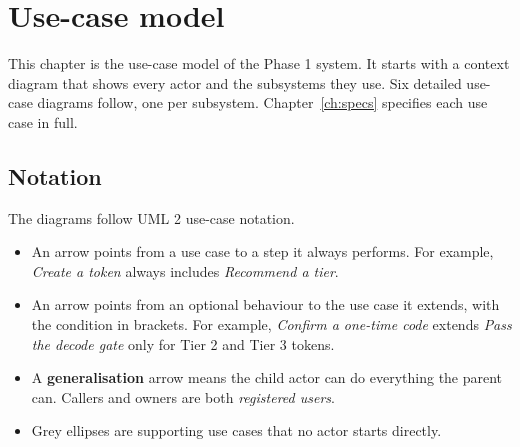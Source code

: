 \chapter{Use-case model}
\label{ch:usecases}

This chapter is the use-case model of the Phase 1 system. It starts with a context diagram that shows every actor and the subsystems they use. Six detailed use-case diagrams follow, one per subsystem. Chapter~\ref{ch:specs} specifies each use case in full.

\section{Notation}

The diagrams follow UML 2 use-case notation.

\begin{center}\begin{fitfig}
\end{fitfig}\end{center}

\begin{itemize}
  \item An \textbf{} arrow points from a use case to a step it always performs. For example, \emph{Create a token} always includes \emph{Recommend a tier}.
  \item An \textbf{} arrow points from an optional behaviour to the use case it extends, with the condition in brackets. For example, \emph{Confirm a one-time code} extends \emph{Pass the decode gate} only for Tier 2 and Tier 3 tokens.
  \item A \textbf{generalisation} arrow means the child actor can do everything the parent can. Callers and owners are both \emph{registered users}.
  \item Grey ellipses are supporting use cases that no actor starts directly.
\end{itemize}

